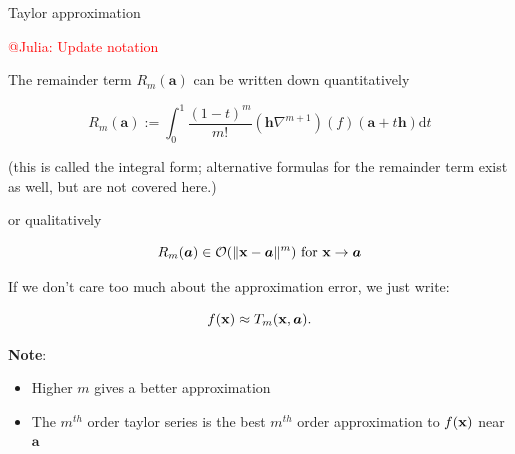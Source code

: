 \begin{vbframe}{Taylor approximation}

\textcolor{red}{@Julia: Update notation}

The remainder term $R_m(\bm{a})$ can be written down quantitatively

$$
R_{m}(\bm{a}) := \int_{0}^{1}\frac{(1-t)^{m}}{m!}(\bm{h}\nabla^{m+1})(f)(\bm{a}+t\bm{h}) \text{d}t
$$

\begin{footnotesize}
(this is called the integral form; alternative formulas for the remainder term exist as well, but are not covered here.)
\end{footnotesize}

\lz 

or qualitatively

$$
R_{m}(\bm{a}) \in \mathcal{O}(\|\mathbf{x} - \bm{a}\|^m) \text{ for } \mathbf{x} \to \bm{a}
$$

\lz 

If we don't care too much about the approximation error, we just write: 

$$
  f(\mathbf{x}) \approx T_m(\mathbf{x}, \bm{a}). 
$$

\framebreak 

\textbf{Note}: 
\begin{itemize}
  \item Higher $m$ gives a better approximation
  \item The $m^{th}$ order taylor series is the best $m^{th}$ order approximation to $f(\mathbf{x})$ near $\bm{a}$
\end{itemize}



\end{vbframe}
